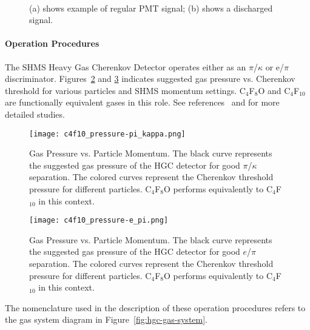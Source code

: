 {\begin{figure}
     \centering
     ~
     \caption{(a) shows example of regular PMT signal; (b) shows a discharged signal.}
     \label{hgc:signal}
\end{figure}

%
%
%

\paragraph{Operation Procedures}
%
The SHMS Heavy Gas Cherenkov Detector operates either as an $\pi$/$\kappa$ or
e/$\pi$ discriminator.  Figures~\ref{fig:c4f10-pressure-pi-kappa} and
\ref{fig:c4f10-pressure-e-pi} indicates suggested gas pressure vs. Cherenkov
threshold for various particles and SHMS momentum settings.  C$_4$F$_8$O and
C$_4$F$_{10}$ are functionally equivalent gases in this role.
See references~ \cite{docdb:SHMS-HGC-pi-kappa-docs} and \cite{docdb:SHMS-HGC-e-pi-docs}
for more detailed studies.

\begin{figure}
\centering
\texttt{[image: c4f10\_pressure-pi\_kappa.png]}
\caption{Gas Pressure vs. Particle Momentum. The black curve represents the
  suggested gas pressure of the HGC detector for good $\pi$/$\kappa$
  separation.  The colored curves represent the Cherenkov threshold pressure
  for different particles.  C$_4$F$_8$O performs equivalently to C$_4$F$_{10}$ in this
  context.
}
\label{fig:c4f10-pressure-pi-kappa}
\end{figure}

\begin{figure}
\centering
\texttt{[image: c4f10\_pressure-e\_pi.png]}
\caption{Gas Pressure vs. Particle Momentum. The black curve represents the
  suggested gas pressure of the HGC detector for good $e$/$\pi$
  separation. The colored curves represent the Cherenkov threshold pressure
  for different particles.  C$_4$F$_8$O performs equivalently to C$_4$F$_{10}$ in this context.
}
\label{fig:c4f10-pressure-e-pi}
\end{figure}

The nomenclature used in the description of these operation procedures refers
to the gas system diagram in Figure~\ref{fig:hgc-gas-system}.

}
